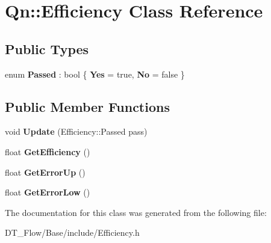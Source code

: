 \hypertarget{classQn_1_1Efficiency}{}\section{Qn\+:\+:Efficiency Class Reference}
\label{classQn_1_1Efficiency}
\subsection*{Public Types}
\begin{DoxyCompactItemize}
\item 
\mbox{\label{classQn_1_1Efficiency_af2846ec080a0960b2247f929da405cbb}} 
enum {\bfseries Passed} \+: bool \{ {\bfseries Yes} = true, 
{\bfseries No} = false
 \}
\end{DoxyCompactItemize}
\subsection*{Public Member Functions}
\begin{DoxyCompactItemize}
\item 
\mbox{\label{classQn_1_1Efficiency_a03f2282ff7e4352d8f7a4500f0f82008}} 
void {\bfseries Update} (Efficiency\+::\+Passed pass)
\item 
\mbox{\label{classQn_1_1Efficiency_ae0e3e892fcf788469f1b3ed39e78f7f2}} 
float {\bfseries Get\+Efficiency} ()
\item 
\mbox{\label{classQn_1_1Efficiency_ab4273c19749d748d601220cf8750897d}} 
float {\bfseries Get\+Error\+Up} ()
\item 
\mbox{\label{classQn_1_1Efficiency_a13ef74fcbd052fa99fb558676b2e6880}} 
float {\bfseries Get\+Error\+Low} ()
\end{DoxyCompactItemize}


The documentation for this class was generated from the following file\+:\begin{DoxyCompactItemize}
\item 
D\+T\+\_\+\+Flow/\+Base/include/Efficiency.\+h\end{DoxyCompactItemize}
